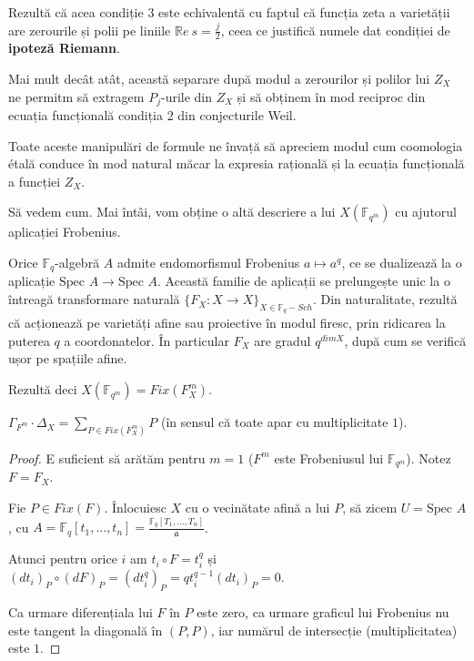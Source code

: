 \documentclass[13pt,openany]{book}
\begin{document}
Rezultă că acea condiție 3 este echivalentă cu faptul că funcția zeta a varietății are zerourile și polii pe liniile $\mathbb{R}e\ s=\frac{j}{2}$, ceea ce justifică numele dat condiției de {\bf ipoteză Riemann}.

Mai mult decât atât, această separare după modul a zerourilor și polilor lui $Z_X$ ne permitm să extragem $P_j$-urile din $Z_X$ și să obținem în mod reciproc din ecuația funcțională condiția 2 din conjecturile Weil.

Toate aceste manipulări de formule ne învață să apreciem modul cum coomologia étală conduce în mod natural măcar la expresia rațională și la ecuația funcțională a funcției $Z_X$.

Să vedem cum. Mai întâi, vom obține o altă descriere a lui $X(\mathbb{F}_{q^m})$ cu ajutorul aplicației Frobenius.

Orice $\mathbb{F}_q$-algebră $A$ admite endomorfismul Frobenius $a \mapsto a^q$, ce se dualizează la o aplicație $\text{Spec } A \rightarrow \text{Spec } A$. Această familie de aplicații se prelungește unic la o întreagă transformare naturală $\{F_X : X \rightarrow X\}_{X \in \mathbb{F}_q-Sch}$. Din naturalitate, rezultă că acționează pe varietăți afine sau proiective în modul firesc, prin ridicarea la puterea $q$ a coordonatelor. În particular $F_X$ are gradul $q^{dim X}$, după cum se verifică ușor pe spațiile afine.

Rezultă deci  $X(\mathbb{F}_{q^m})=Fix(F_X^m)$.

\begin{lema}
$\Gamma_{F^m} \cdot \Delta_X = \sum\limits_{P \in Fix(F_X^m)} P$ (în sensul că toate apar cu multiplicitate $1$).
\end{lema}

\begin{proof}
E suficient să arătăm pentru $m=1$ ($F^m$ este Frobeniusul lui $\mathbb{F}_{q^m}$). Notez $F=F_X$.

Fie $P\in Fix(F)$. Înlocuiesc $X$ cu o vecinătate afină a lui $P$, să zicem $U=\text{Spec }A$, cu $A=\mathbb{F}_q[t_1,...,t_n]=\frac{\mathbb{F}_q[T_1,...,T_n]}{\mathfrak{a}}$.

Atunci pentru orice $i$ am $t_i \circ F = t_i^q$ și $(dt_i)_P \circ (dF)_P = (dt_i^q)_P = qt_i^{q-1}(dt_i)_P = 0$.

Ca urmare diferențiala lui $F$ în $P$ este zero, ca urmare graficul lui Frobenius nu este tangent la diagonală în $(P,P)$, iar numărul de intersecție (multiplicitatea) este $1$. 
\end{proof}
\end{document}
